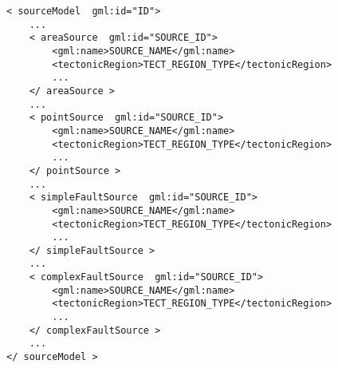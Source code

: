 \begin{verbatim}
< sourceModel  gml:id="ID">
	...
	< areaSource  gml:id="SOURCE_ID">
		<gml:name>SOURCE_NAME</gml:name>
		<tectonicRegion>TECT_REGION_TYPE</tectonicRegion>
		...
	</ areaSource >
	...
	< pointSource  gml:id="SOURCE_ID">
		<gml:name>SOURCE_NAME</gml:name>
		<tectonicRegion>TECT_REGION_TYPE</tectonicRegion>
		...
	</ pointSource >
	...
	< simpleFaultSource  gml:id="SOURCE_ID">
		<gml:name>SOURCE_NAME</gml:name>
		<tectonicRegion>TECT_REGION_TYPE</tectonicRegion>
		...
	</ simpleFaultSource >
	...
	< complexFaultSource  gml:id="SOURCE_ID">
		<gml:name>SOURCE_NAME</gml:name>
		<tectonicRegion>TECT_REGION_TYPE</tectonicRegion>
		...
	</ complexFaultSource >
	...
</ sourceModel >
\end{verbatim}

